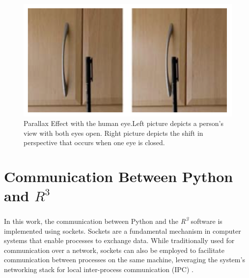 \begin{figure}
    \centering
    \includegraphics[width=\textwidth]{Images/02stateart/pen.png}
    \caption{Parallax Effect with the human eye.Left picture depicts
    a person’s view with both eyes open. Right picture depicts the shift in perspective that occurs when one eye is closed.}
    \label{fig:pen}
\end{figure}

\section{Communication Between Python and \texorpdfstring{$R^3$}{R3}}
\label{sec:communication_python_r3}

\noindent In this work, the communication between Python and the \textit{R\textsuperscript{3}} software is implemented using sockets. Sockets are a fundamental mechanism in computer systems that enable processes to exchange data. While traditionally used for communication over a network, sockets can also be employed to facilitate communication between processes on the same machine, leveraging the system's networking stack for local inter-process communication (IPC) \cite{stevens2003unix, silberschatz2018os}.

